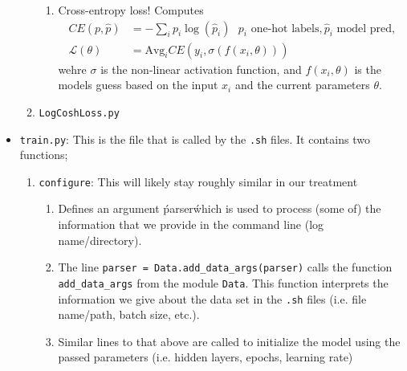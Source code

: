 \begin{itemize}
\begin{enumerate}
\begin{enumerate}
                \item Cross-entropy loss! Computes
                \begin{equation}
                    \begin{aligned}
                        CE(p,  \hat{p}) &= -\sum_ip_i\log(\hat{p}_i) \ \ \ p_i \text{ one-hot labels}, \hat{p}_i \text{ model pred,}\\
                        \mathcal{L}(\theta) &= \text{Avg}_i CE(y_i, \sigma(f(x_i, \theta)))
                    \end{aligned}
                \end{equation}
                wehre $\sigma$ is the non-linear activation function, and $f(x_i, \theta)$ is the models guess based on the input $x_i$ and the current parameters $\theta$. 
            \end{enumerate}

        \item \texttt{LogCoshLoss.py}
    \end{enumerate}

    \item \texttt{train.py}: This is the file that is called by the \texttt{.sh} files. It contains two functions;
        \begin{enumerate}
            \item \texttt{configure}: This will likely stay roughly similar in our treatment
                \begin{enumerate}
                    \item Defines an argument \'parser\' which is used to process (some of) the information that we provide in the command line (log name/directory).

                    \item The line \texttt{parser = Data.add\_data\_args(parser)} calls the function \texttt{add\_data\_args} from the module \texttt{Data}. This function interprets the information we give about the data set in the \texttt{.sh} files (i.e. file name/path, batch size, etc.).

                    \item Similar lines to that above are called to initialize the model using the passed parameters (i.e. hidden layers, epochs, learning rate)
                \end{enumerate}


\end{enumerate}
\end{itemize}
